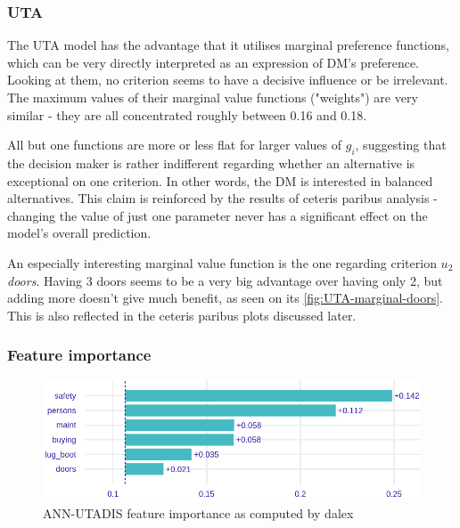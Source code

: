 \documentclass[../main.tex]{subfiles}
\begin{document}
\subsubsection{UTA}
The UTA model has the advantage that it utilises marginal preference functions,
which can be very directly interpreted as an expression of DM's preference.
Looking at them, no criterion seems to have a decisive influence or be irrelevant.
The maximum values of their marginal value functions ("weights")
are very similar - they are all concentrated roughly between 0.16 and 0.18.

All but one functions are more or less flat for larger values of $g_i$, suggesting
that the decision maker is rather indifferent regarding whether an alternative is
exceptional on one criterion. In other words, the DM is interested in balanced alternatives.
This claim is reinforced by the results of ceteris paribus analysis -
changing the value of just one parameter never has a significant effect on
the model's overall prediction.

An especially interesting marginal value function is the one regarding criterion $u_2$ \emph{doors}.
Having 3 doors seems to be a very big advantage over having only 2,
but adding more doesn't give much benefit, as seen on  its \ref{fig:UTA-marginal-doors}.
This is also reflected in the ceteris paribus plots discussed later.

\subsubsection{Feature importance}

\begin{figure}[H]
    \centering
    \includegraphics[width=\linewidth]{../img/UTA-feature-importance.png}
    \caption{ANN-UTADIS feature importance as computed by dalex}
    \label{fig:UTA-feats}
\end{figure}
\end{document}

